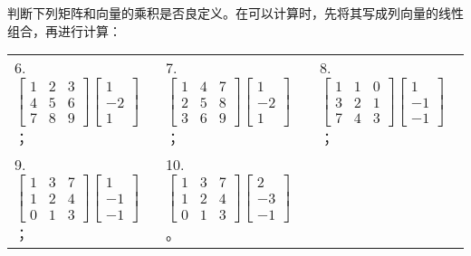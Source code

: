 	\begin{exercise}[1.2.2]
		判断下列矩阵和向量的乘积是否良定义。在可以计算时，先将其写成列向量的线性组合，再进行计算：
		\begin{table}[htbp]
			\centering
			\begin{tabular}{p{0.33\textwidth}p{}p{}}
				6. $\begin{bmatrix}
					1&2&3\\
					4&5&6\\
					7&8&9
				\end{bmatrix}\begin{bmatrix}
					1\\-2\\1
			\end{bmatrix}$；&7. $\begin{bmatrix}
				1&4&7\\
				2&5&8\\
				3&6&9
			\end{bmatrix}\begin{bmatrix}
				1\\-2\\1
			\end{bmatrix}$；&8. $\begin{bmatrix}
				1&1&0\\
				3&2&1\\
				7&4&3
			\end{bmatrix}\begin{bmatrix}
				1\\-1\\-1
			\end{bmatrix}$；\\
			9. $\begin{bmatrix}
				1&3&7\\
				1&2&4\\
				0&1&3
			\end{bmatrix}\begin{bmatrix}
				1\\-1\\-1
			\end{bmatrix}$；&10. $\begin{bmatrix}
			1&3&7\\
			1&2&4\\
			0&1&3
			\end{bmatrix}\begin{bmatrix}
			2\\-3\\-1
			\end{bmatrix}$。
			\end{tabular}
		\end{table}
	\end{exercise}

